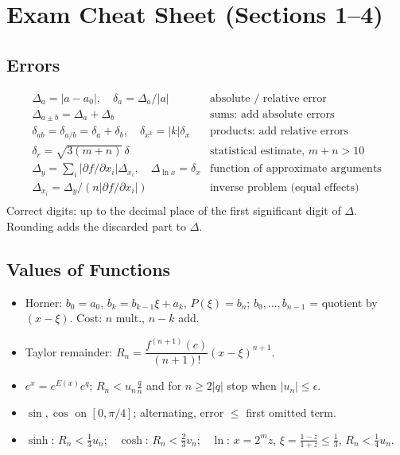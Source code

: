 \documentclass[hidelinks]{article}
\newcommand{\abs}[1]{\left|#1\right|}
\begin{document}
\section{Exam Cheat Sheet (Sections 1--4)}

\subsection{Errors}
\[
\begin{array}{ll}
\Delta_a=\abs{a-a_0},\quad \delta_a=\Delta_a/\abs a & \text{absolute / relative error}\\
\Delta_{a\pm b}=\Delta_a+\Delta_b & \text{sums: add absolute errors}\\
\delta_{ab}=\delta_{a/b}=\delta_a+\delta_b,\quad \delta_{x^k}=\abs k\delta_x & \text{products: add relative errors}\\
\delta_r=\sqrt{3(m+n)}\,\delta & \text{statistical estimate, }m+n>10\\
\Delta_y=\sum_i\abs{\partial f/\partial x_i}\Delta_{x_i},\quad \Delta_{\ln x}=\delta_x & \text{function of approximate arguments}\\
\Delta_{x_i}=\Delta_y/(n\abs{\partial f/\partial x_i}) & \text{inverse problem (equal effects)}\\
\end{array}
\]
Correct digits: up to the decimal place of the first significant digit of $\Delta$. Rounding adds the discarded part to $\Delta$.

\subsection{Values of Functions}
\begin{itemize}
    \item Horner: $b_0=a_0$, $b_k=b_{k-1}\xi+a_k$, $P(\xi)=b_n$; $b_0,\dots,b_{n-1}$ = quotient by $(x-\xi)$. Cost: $n$ mult., $n-k$ add.
    \item Taylor remainder: $R_n=\dfrac{f^{(n+1)}(c)}{(n+1)!}(x-\xi)^{n+1}$.
    \item $e^x=e^{E(x)}e^q$; $R_n<u_n\frac qn$ and for $n\ge2\abs q$ stop when $\abs{u_n}\le\epsilon$.
    \item $\sin,\cos$ on $[0,\pi/4]$; alternating, error $\le$ first omitted term.
    \item $\sinh$: $R_n<\frac13u_n$;\ \ $\cosh$: $R_n<\frac23v_n$;\ \ $\ln$: $x=2^mz$, $\xi=\frac{1-z}{1+z}\le\frac13$, $R_n<\frac14u_n$.
\end{itemize}
\end{document}
